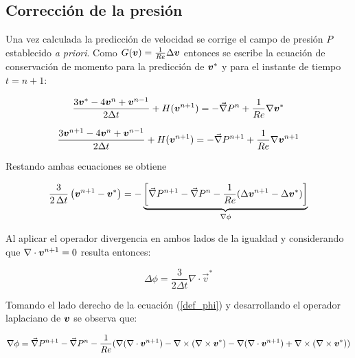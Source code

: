 \subsection{Corrección de la presión}

Una vez calculada la predicción de velocidad se corrige el campo de presión $P$ establecido \textit{a priori}. Como $G(\boldsymbol{v}) = \frac{1}{Re} \Delta \boldsymbol{v}$ entonces se escribe la ecuación de conservación de momento para la predicción de $\boldsymbol{v}^*$ y para el instante de tiempo $t=n+1$:

\begin{equation}
\dfrac{3 \boldsymbol{v}^* -4 \boldsymbol{v}^n + \boldsymbol{v}^{n-1} }{2 \Delta t} + H(\boldsymbol{v}^{n+1}) = - \vec{\nabla} P^n + \dfrac{1}{Re} \nabla \boldsymbol{v}^*
\end{equation}

\begin{equation}
\dfrac{3 \boldsymbol{v}^{n+1} -4 \boldsymbol{v}^n + \boldsymbol{v}^{n-1} }{2 \Delta t} + H(\boldsymbol{v}^{n+1}) = - \vec{\nabla} P^{n+1} + \dfrac{1}{Re} \nabla \boldsymbol{v}^{n+1}
\end{equation}

Restando ambas ecuaciones se obtiene

\begin{equation} \label{def_phi}
\dfrac{3}{2 \, \Delta t} \left( \boldsymbol{v}^{n+1} - \boldsymbol{v}^* \right) = - \underbrace{ \left[ \vec{\nabla} P^{n+1} - \vec{\nabla} P^n - \dfrac{1}{Re} (\Delta \boldsymbol{v}^{n+1} - \Delta \boldsymbol{v}^* ) \right] }_{\nabla \phi}
\end{equation}

Al aplicar el operador divergencia en ambos lados de la igualdad y considerando que $\nabla \cdot \boldsymbol{v}^{n+1} = 0$ resulta entonces:

\begin{equation} \label{poisson}
\Delta \phi = \dfrac{3}{2 \Delta t} \nabla \cdot \vec{v}^*
\end{equation}

Tomando el lado derecho de la ecuación (\ref{def_phi}) y desarrollando el operador laplaciano de $\boldsymbol{v}$ se observa que:

\begin{equation}
\nabla \phi = \vec{\nabla} P^{n+1} - \vec{\nabla} P^n - \dfrac{1}{Re} ( \nabla ( \nabla \cdot \boldsymbol{v}^{n+1} ) - \nabla \times (\nabla \times \boldsymbol{v}^{*}) - \nabla ( \nabla \cdot \boldsymbol{v}^{n+1} ) + \nabla \times (\nabla \times \boldsymbol{v}^{*})  )
\end{equation}

